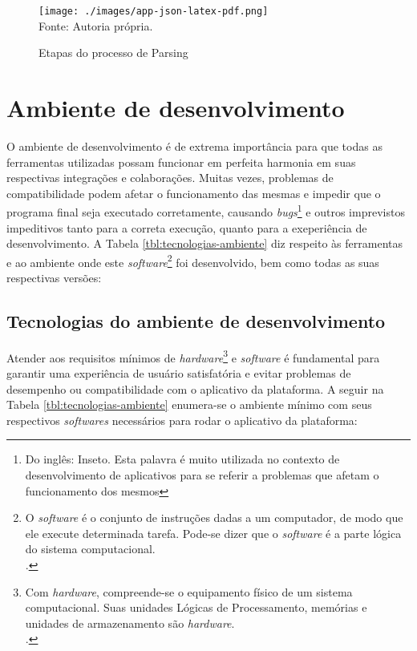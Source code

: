 \begin{figure}[H]
    \centering
    \caption{Etapas do processo de Parsing}
    \texttt{[image: ./images/app-json-latex-pdf.png]}
    \label{fig:app-json-latex-pdf} \\
    \textnormal{\fontsize{10pt}{12pt}Fonte: Autoria própria.}
\end{figure}

\section{Ambiente de desenvolvimento}

O ambiente de desenvolvimento é de extrema importância para que todas as ferramentas
utilizadas possam funcionar em perfeita harmonia em suas respectivas integrações e
colaborações. Muitas vezes, problemas de compatibilidade podem afetar
o funcionamento das mesmas e impedir que o programa final
seja executado corretamente, causando
\textit{bugs}\footnote{Do inglês: Inseto. Esta palavra é muito utilizada no contexto de desenvolvimento de aplicativos
para se referir a problemas que afetam o funcionamento dos mesmos
}
e outros imprevistos impeditivos tanto para a correta execução, quanto
para a exeperiência de desenvolvimento.
A
Tabela \ref{tbl:tecnologias-ambiente}                
diz respeito às ferramentas e ao ambiente onde este
\textit{software}\footnote{O \textit{software} é o conjunto de instruções dadas a um computador, de modo que
    ele execute determinada tarefa. Pode-se dizer que o \textit{software} é
    a parte lógica do sistema computacional.  \\  \cite{hardware-e-software}.
}
foi desenvolvido, bem como todas as suas respectivas versões:

\clearpage

\subsection{Tecnologias do ambiente de desenvolvimento}

Atender aos requisitos mínimos de
\textit{hardware}\footnote{Com \textit{hardware}, compreende-se o equipamento físico de um sistema computacional.
    Suas unidades Lógicas de Processamento, memórias e unidades de armazenamento são
    \textit{hardware}.  \\  \cite{hardware-e-software}.
}
e \textit{software} é fundamental para garantir uma experiência de usuário satisfatória
e evitar problemas de desempenho ou compatibilidade com o aplicativo da plataforma.
A seguir
na
Tabela \ref{tbl:tecnologias-ambiente}
enumera-se o ambiente mínimo com seus respectivos
\textit{softwares}
necessários
para rodar o aplicativo da plataforma:

